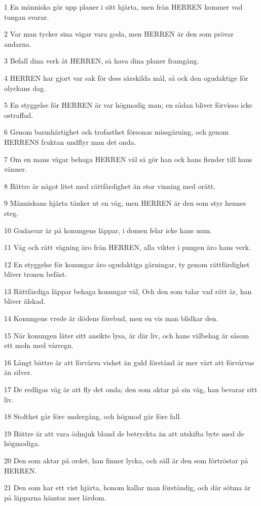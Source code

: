 \par 1 En människa gör upp planer i sitt hjärta, men från HERREN kommer vad tungan svarar.
\par 2 Var man tycker sina vägar vara goda, men HERREN är den som prövar andarna.
\par 3 Befall dina verk åt HERREN, så hava dina planer framgång.
\par 4 HERREN har gjort var sak för dess särskilda mål, så ock den ogudaktige för olyckans dag.
\par 5 En styggelse för HERREN är var högmodig man; en sådan bliver förvisso icke ostraffad.
\par 6 Genom barmhärtighet och trofasthet försonas missgärning, och genom HERRENS fruktan undflyr man det onda.
\par 7 Om en mans vägar behaga HERREN väl så gör han ock hans fiender till hans vänner.
\par 8 Bättre är något litet med rättfärdighet än stor vinning med orätt.
\par 9 Människans hjärta tänker ut en väg, men HERREN är den som styr hennes steg.
\par 10 Gudasvar är på konungens läppar, i domen felar icke hans mun.
\par 11 Våg och rätt vägning äro från HERREN, alla vikter i pungen äro hans verk.
\par 12 En styggelse för konungar äro ogudaktiga gärningar, ty genom rättfärdighet bliver tronen befäst.
\par 13 Rättfärdiga läppar behaga konungar väl, Och den som talar vad rätt är, han bliver älskad.
\par 14 Konungens vrede är dödens förebud, men en vis man blidkar den.
\par 15 När konungen låter sitt ansikte lysa, är där liv, och hans välbehag är såsom ett moln med vårregn.
\par 16 Långt bättre är att förvärva vishet än guld förstånd är mer värt att förvärvas än silver.
\par 17 De redligas väg är att fly det onda; den som aktar på sin väg, han bevarar sitt liv.
\par 18 Stolthet går före undergång, och högmod går före fall.
\par 19 Bättre är att vara ödmjuk bland de betryckta än att utskifta byte med de högmodiga.
\par 20 Den som aktar på ordet, han finner lycka, och säll är den som förtröstar på HERREN.
\par 21 Den som har ett vist hjärta, honom kallar man förståndig, och där sötma är på läpparna hämtas mer lärdom.

